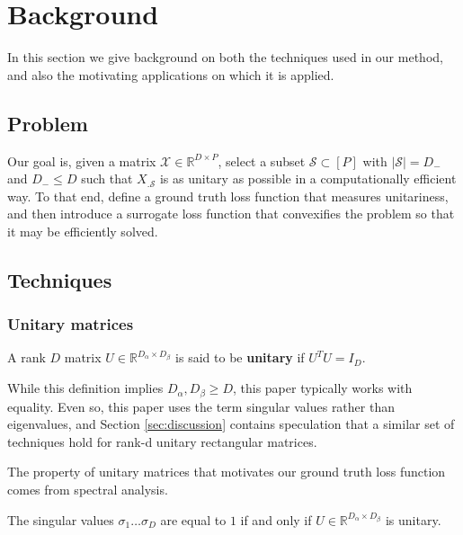 \section{Background}

In this section we give background on both the techniques used in our method, and also the motivating applications on which it is applied.

\subsection{Problem}

Our goal is, given a matrix $\mathcal X \in \mathbb R^{D \times P}$, select a subset $\mathcal S \subset [P]$ with $|\mathcal S| = D_{-}$ and $D_{-} \leq D$ such that $X_{. \mathcal S}$ is as unitary as possible in a computationally efficient way.
To that end, define a ground truth loss function that measures unitariness, and then introduce a surrogate loss function that convexifies the problem so that it may be efficiently solved.

\subsection{Techniques}

\subsubsection{Unitary matrices}

\begin{definition}[Unitary]
A rank $D$ matrix $U \in \mathbb R^{D_\alpha \times D_\beta}$ is said to be \textbf{unitary} if $U^TU = I_D$.
\end{definition}

While this definition implies $D_\alpha, D_\beta \geq D$, this paper typically works with equality.
Even so, this paper uses the term singular values rather than eigenvalues, and Section \ref{sec:discussion} contains speculation that a similar set of techniques hold for rank-d unitary rectangular matrices.

The property of unitary matrices that motivates our ground truth loss function comes from spectral analysis.
\begin{proposition}
\label{prop:unitary_spectrum}
The singular values $\sigma_1 \dots \sigma_D$ are equal to $1$ if and only if $U \in \mathbb{R}^{D_\alpha \times D_\beta}$ is unitary.
\end{proposition}


